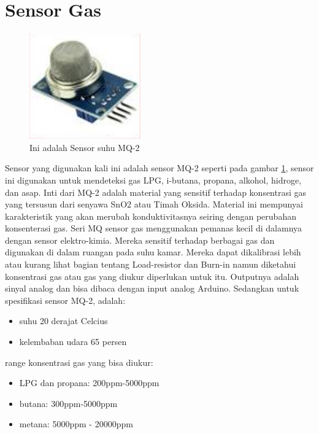 \section{Sensor Gas}
\begin{figure}[!htbp]
  \centering
  \includegraphics[width=.75\textwidth]{figures/mq2.png}
  \caption{Ini adalah Sensor suhu MQ-2 \cite{himawan2017perancangan}}\label{fig:mq2}
\end{figure}	
Sensor yang digunakan kali ini adalah sensor MQ-2 seperti pada gambar \ref{fig:mq2}, sensor ini digunakan untuk mendeteksi gas LPG, i-butana, propana, alkohol, hidroge, dan asap. Inti dari MQ-2 adalah material yang sensitif terhadap konsentrasi gas yang tersusun dari senyawa SnO2 atau Timah Oksida. Material ini mempunyai karakteristik yang akan merubah konduktivitasnya seiring dengan perubahan konsenterasi gas.
Seri MQ sensor gas menggunakan pemanas kecil di dalamnya dengan sensor elektro-kimia. Mereka sensitif terhadap berbagai gas dan digunakan di dalam ruangan pada suhu kamar.
Mereka dapat dikalibrasi lebih atau kurang lihat bagian tentang Load-resistor dan Burn-in namun diketahui konsentrasi gas atau gas yang diukur diperlukan untuk itu.
Outputnya adalah sinyal analog dan bisa dibaca dengan input analog Arduino.
Sedangkan untuk spesifikasi sensor MQ-2, adalah:
\begin{itemize}
\item suhu 20 derajat Celcius
\item kelembaban udara 65 persen
\end{itemize}
range konsentrasi gas yang bisa diukur:
\begin{itemize}
\item LPG dan propana: 200ppm-5000ppm
\item butana: 300ppm-5000ppm
\item metana: 5000ppm - 20000ppm
\end{itemize}

